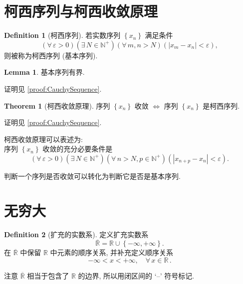 \documentclass{book}
\newcommand{\union}{\cup}
\newcommand{\bideduce}{\Longleftrightarrow}
\newcommand{\Exists}{\exists\,}
\newcommand{\Any}{\forall\,}
\newcommand{\set}[1]{\left\{#1\right\}}
\newcommand{\exR}{\overline{\mathbb{R}}}
\newcommand{\abs}[1]{\left\lvert #1 \right\rvert}
\newcommand{\R}{\mathbb{R}}
\newcommand{\N}{\mathbb{N}}
\numberwithin{equation}{section}
\numberwithin{figure}{section}
\theoremstyle{definition}
\newtheorem{definition}{Definition}
\newtheorem{theorem}{Theorem}[section]
\newtheorem{lemma}{Lemma}[section]
\newcommand{\sq}[1]{`#1'}
\begin{document}
\section{柯西序列与柯西收敛原理}
\begin{definition}[柯西序列]
  若实数序列 $\set{x_n}$ 满足条件
  \begin{equation*}
    (\Any \varepsilon>0)(\Exists N\in\N^+)(\Any m,n>N)(\abs{x_m-x_n}<\varepsilon),
  \end{equation*}
  则被称为柯西序列 (基本序列).
\end{definition}
\begin{lemma}
  基本序列有界.
  \label{lem:CauchySequenceHasBoundary}
\end{lemma}
证明见 \cref{proof:CauchySequence}.

\begin{theorem}[柯西收敛原理]
  序列 $\set{x_n}$ 收敛 $\bideduce$ 序列 $\set{x_n}$ 是柯西序列.
  \label{the:CauchyConvergence}
\end{theorem}
证明见 \cref{proof:CauchySequence}.

柯西收敛原理可以表述为:\\
序列 $\set{x_n}$ 收敛的充分必要条件是
\begin{equation*}
  (\Any \varepsilon>0)(\Exists N\in\N^+)(\Any n>N,p\in\N^+)(\abs{x_{n+p}-x_n}<\varepsilon).
\end{equation*}

判断一个序列是否收敛可以转化为判断它是否是基本序列.

\section{无穷大}
\begin{definition}[扩充的实数系]
  定义扩充实数系
  \begin{equation*}
    \exR=\R\union\set{-\infty,+\infty}.
  \end{equation*}
  在 $\exR$ 中保留 $\R$ 中元素的顺序关系, 并补充定义顺序关系
  \begin{equation*}
    -\infty<x<+\infty,\quad\Any x\in\R\,.
  \end{equation*}
\end{definition}
注意 $\exR$ 相当于包含了 $\R$ 的边界, 所以用闭区间的 \sq{--} 符号标记.
\end{document}
